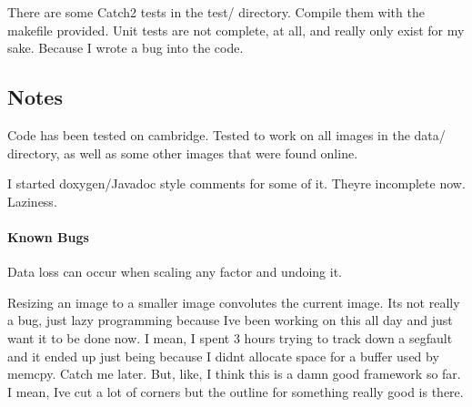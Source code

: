 There are some Catch2 tests in the {\ttfamily test/} directory. Compile them with the makefile provided. Unit tests are not complete, at all, and really only exist for my sake. Because I wrote a bug into the code.

\subsection*{Notes}

Code has been tested on cambridge. Tested to work on all images in the {\ttfamily data/} directory, as well as some other images that were found online.

I started doxygen/\+Javadoc style comments for some of it. They\textquotesingle{}re incomplete now. Laziness.

\paragraph*{Known Bugs}

Data loss can occur when scaling any factor and undoing it.

Resizing an image to a smaller image convolutes the current image. It\textquotesingle{}s not really a bug, just lazy programming because I\textquotesingle{}ve been working on this all day and just want it to be done now. I mean, I spent 3 hours trying to track down a segfault and it ended up just being because I didn\textquotesingle{}t allocate space for a buffer used by memcpy. Catch me later. But, like, I think this is a damn good framework so far. I mean, I\textquotesingle{}ve cut a lot of corners but the outline for something really good is there. 